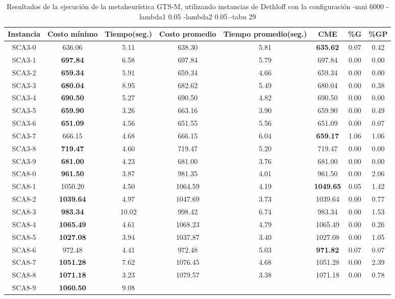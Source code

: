\begin{table}[h]
\caption{Resultados de la ejecución de la metaheurística GTS-M, utilizando instancias de Dethloff con la configuración -mni 6000 -lambda1 0.05 -lambda2 0.05 -tabu 29}
\centering
\small
\begin{tabular}{c c c c c c c c}
\hline\hline
Instancia & Costo mínimo & Tiempo(seg.) & Costo promedio & Tiempo promedio(seg.) & CME & \%G & \%GP \\ [0.5ex]
\hline
SCA3-0 & 636.06 & 5.11 & 
638.30 & 5.81 & \bf{635.62} & 
0.07 & 0.42\\SCA3-1 & \bf{697.84} & 6.58 & 
697.84 & 5.79 & 697.84 & 0.00
 & 0.00\\
SCA3-2 & \bf{659.34} & 5.91 & 
659.34 & 4.66 & 659.34 & 0.00
 & 0.00\\
SCA3-3 & \bf{680.04} & 8.95 & 
682.62 & 5.49 & 680.04 & 0.00
 & 0.38\\SCA3-4 & \bf{690.50} & 5.27 & 
690.50 & 4.82 & 690.50 & 0.00
 & 0.00\\
SCA3-5 & \bf{659.90} & 3.26 & 
663.16 & 3.90 & 659.90 & 0.00
 & 0.49\\SCA3-6 & \bf{651.09} & 4.56 & 
651.55 & 5.56 & 651.09 & 0.00
 & 0.07\\SCA3-7 & 666.15 & 4.68 & 
666.15 & 6.04 & \bf{659.17} & 
1.06 & 1.06\\SCA3-8 & \bf{719.47} & 4.60 & 
719.47 & 5.20 & 719.47 & 0.00
 & 0.00\\
SCA3-9 & \bf{681.00} & 4.23 & 
681.00 & 3.76 & 681.00 & 0.00
 & 0.00\\
SCA8-0 & \bf{961.50} & 3.87 & 
981.35 & 4.01 & 961.50 & 0.00
 & 2.06\\SCA8-1 & 1050.20 & 4.50 & 
1064.59 & 4.19 & \bf{1049.65} & 
0.05 & 1.42\\SCA8-2 & \bf{1039.64} & 4.97 & 
1047.69 & 3.73 & 1039.64 & 0.00
 & 0.77\\SCA8-3 & \bf{983.34} & 10.02 & 
998.42 & 6.74 & 983.34 & 0.00
 & 1.53\\SCA8-4 & \bf{1065.49} & 4.61 & 
1068.23 & 4.79 & 1065.49 & 0.00
 & 0.26\\SCA8-5 & \bf{1027.08} & 3.94 & 
1037.87 & 3.40 & 1027.08 & 0.00
 & 1.05\\SCA8-6 & 972.48 & 4.41 & 
972.48 & 5.03 & \bf{971.82} & 
0.07 & 0.07\\SCA8-7 & \bf{1051.28} & 7.62 & 
1076.45 & 4.68 & 1051.28 & 0.00
 & 2.39\\SCA8-8 & \bf{1071.18} & 3.23 & 
1079.57 & 3.38 & 1071.18 & 0.00
 & 0.78\\SCA8-9 & \bf{1060.50} & 9.08 & 

\end{tabular}
\end{table}
